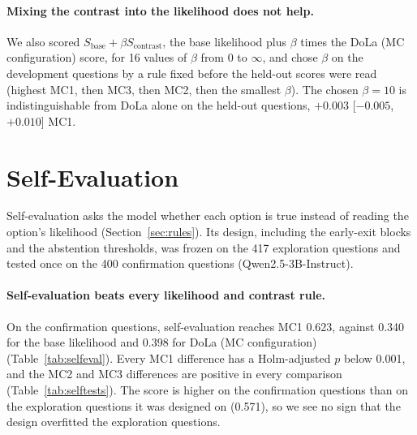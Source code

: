 \documentclass[11pt]{article}
\newcommand{\mainmodel}{Qwen2.5-3B-Instruct}
\begin{document}
\begin{table}[t]
\centering\small\setlength{\tabcolsep}{3.5pt}
\caption{Option length and option scores on the 767 held-out questions. Length correlation: mean within-question
Spearman correlation between the option score and its length in characters (second option set). Matched pairs:
length-matched pairwise accuracy, the share of true--false option pairs whose token counts differ by at most one in
which the true option scores higher (654 questions have such pairs). Picks longest: share of questions in which the
rule's MC1 choice is the longest option by token count. The token-count baseline loses on ties, which MC1 counts as wrong.}
\label{tab:length}
\end{table}

\paragraph{Mixing the contrast into the likelihood does not help.}
We also scored $S_{\text{base}} + \beta S_{\text{contrast}}$, the base likelihood plus $\beta$ times the DoLa (MC
configuration) score, for 16 values of $\beta$ from 0 to $\infty$, and chose $\beta$ on the development questions
by a rule fixed before the held-out scores were read (highest MC1, then MC3, then MC2, then the smallest $\beta$).
The chosen $\beta = 10$ is indistinguishable from DoLa alone on the held-out questions, $+0.003$ [$-0.005$, $+0.010$]
MC1.

\section{Self-Evaluation}
\label{sec:selfeval}

Self-evaluation asks the model whether each option is true instead of reading the option's likelihood
(Section~\ref{sec:rules}). Its design, including the early-exit blocks and the abstention thresholds, was frozen on
the 417 exploration questions and tested once on the 400 confirmation questions (\mainmodel{}).

\paragraph{Self-evaluation beats every likelihood and contrast rule.}
On the confirmation questions, self-evaluation reaches MC1 0.623, against 0.340 for the base likelihood and 0.398
for DoLa (MC configuration) (Table~\ref{tab:selfeval}). Every MC1 difference has a Holm-adjusted $p$ below 0.001,
and the MC2 and MC3 differences are positive in every comparison (Table~\ref{tab:selftests}). The score is higher on
the confirmation questions than on the exploration questions it was designed on (0.571), so we see no sign that the
design overfitted the exploration questions.
\end{document}
